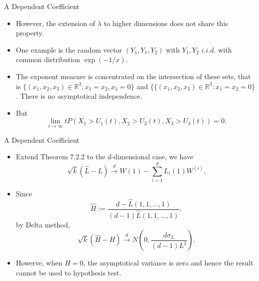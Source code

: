 \documentclass[11pt]{beamer}
\begin{document}
\begin{frame}{A Dependent Coefficient}
\begin{itemize}
\item However, the extension of $\lambda $ to higher dimensions does not share this property.
\item One example is the random vector $(Y_1,Y_1,Y_2)$ with $Y_1,Y_2$ $i.i.d.$ with common distribution $\exp(-1/x)$.
\item The exponent measure is concentrated on the intersection of these sets, that is $\{(x_1,x_2,x_3)\in\mathbb{R}^3: x_1=x_2,x_3=0\}$ and $\{ \{(x_1,x_2,x_3)\in\mathbb{R}^3:x_1=x_2=0\}$. There is no asymptotical independence.
\item But 
\begin{displaymath}
\lim_{t\to \infty}  tP(X_1>U_1(t), X_2>U_2(t), X_3>U_3(t)) =0.
\end{displaymath}
\end{itemize}
\end{frame}
\begin{frame}{A Dependent Coefficient}
\begin{itemize}
\item Extend Theorem 7.2.2 to the $d$-dimensional case, we have 
\begin{displaymath}
\sqrt{k}(\hat{L}-L)\stackrel{d}{\to} W(1)-\sum_{i=1}^d L_i(1)W^{(i)}.
\end{displaymath}
\item Since
$$\hat{H}:=\dfrac{d-\hat{L}(1,1,\dots,1)}{(d-1)\hat{L}(1,1,\dots,1)},$$ 
 by Delta method, 
 \begin{displaymath}
\sqrt{k}(\hat{H}-H)\stackrel{d}{\to} N(0,\dfrac{d\sigma_L}{(d-1)L^2}).
\end{displaymath}
\item Howerve, when $H=0$, the asymptotical variance is zero and hence the result cannot be used to hypothesis test.
\end{itemize}
\end{frame}
\end{document}
